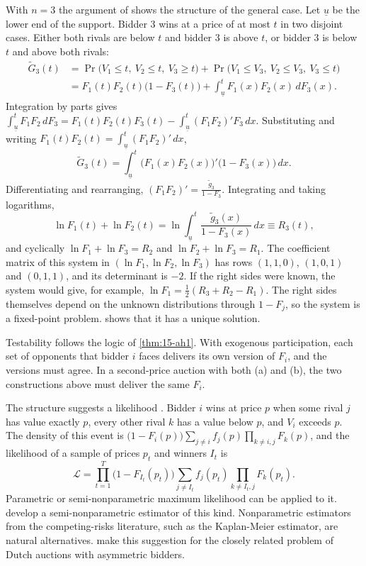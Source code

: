 With $n=3$ the argument of \citet[Section~4.1]{AtheyHaile2007} shows the structure of the general case. Let $\underline
u$ be the lower end of the support. Bidder 3 wins at a price of at most $t$ in two disjoint cases. Either both rivals
are below $t$ and bidder 3 is above $t$, or bidder 3 is below $t$ and above both rivals:
\begin{align*}
\tilde G_3(t)&=\Pr\big(V_1\le t,\ V_2\le t,\ V_3\ge t\big)+\Pr\big(V_1\le V_3,\ V_2\le V_3,\ V_3\le t\big)\\
&=F_1(t)F_2(t)\big(1-F_3(t)\big)+\int_{\underline u}^tF_1(x)F_2(x)\,dF_3(x).
\end{align*}
Integration by parts gives $\int_{\underline u}^tF_1F_2\,dF_3=F_1(t)F_2(t)F_3(t)-\int_{\underline u}^t(F_1F_2)'F_3\,dx$.
Substituting and writing $F_1(t)F_2(t)=\int_{\underline u}^t(F_1F_2)'\,dx$,
\[
\tilde G_3(t)=\int_{\underline u}^t\big(F_1(x)F_2(x)\big)'\big(1-F_3(x)\big)\,dx .
\]
Differentiating and rearranging, $(F_1F_2)'=\frac{\tilde g_3}{1-F_3}$. Integrating and taking logarithms,
\[
\ln F_1(t)+\ln F_2(t)=\ln\int_{\underline u}^t\frac{\tilde g_3(x)}{1-F_3(x)}\,dx\equiv R_3(t),
\]
and cyclically $\ln F_1+\ln F_3=R_2$ and $\ln F_2+\ln F_3=R_1$. The coefficient matrix of this system in
$(\ln F_1,\ln F_2,\ln F_3)$ has rows $(1,1,0)$, $(1,0,1)$ and $(0,1,1)$, and its determinant is $-2$. If the right
sides were known, the system would give, for example, $\ln F_1=\frac12(R_3+R_2-R_1)$. The right sides themselves
depend on the unknown distributions through $1-F_j$, so the system is a fixed-point problem.
\citet{Meilijson1981} shows that it has a unique solution.

Testability follows the logic of \cref{thm:15-ah1}. With exogenous participation, each set of opponents that bidder
$i$ faces delivers its own version of $F_i$, and the versions must agree. In a second-price auction with both (a)
and (b), the two constructions above must deliver the same $F_i$.

The structure suggests a likelihood \citep[equation~(4.7)]{AtheyHaile2007}. Bidder $i$ wins at price $p$ when
some rival $j$ has value exactly $p$, every other rival $k$ has a value below $p$, and $V_i$ exceeds $p$. The
density of this event is $\big(1-F_i(p)\big)\sum_{j\neq i}f_j(p)\prod_{k\neq i,j}F_k(p)$, and the likelihood of a
sample of prices $p_t$ and winners $I_t$ is
\[
\mathcal L=\prod_{t=1}^T\big(1-F_{I_t}(p_t)\big)\sum_{j\neq I_t}f_j(p_t)\prod_{k\neq I_t,j}F_k(p_t).
\]
Parametric or semi-nonparametric maximum likelihood can be applied to it. \citet{BrendstrupPaarsch2006} develop a
semi-nonparametric estimator of this kind. Nonparametric estimators from the competing-risks literature, such as
the Kaplan-Meier estimator, are natural alternatives. \citet[Section~3.3.1]{AtheyHaile2007} make this suggestion for
the closely related problem of Dutch auctions with asymmetric bidders.

